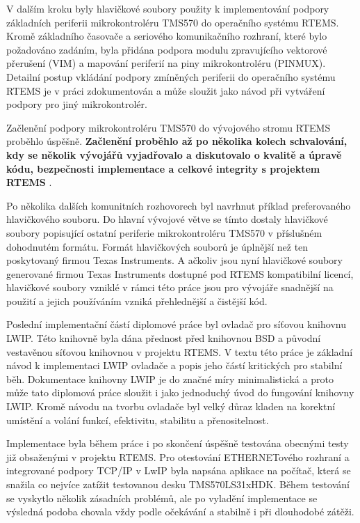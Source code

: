 V dalším kroku byly hlavičkové soubory použity k implementování podpory základních periferii mikrokontroléru TMS570 do operačního systému RTEMS.
Kromě základního časovače a seriového komunikačního rozhraní, které bylo požadováno zadáním, byla přidána podpora modulu zpravujícího vektorové přerušení (VIM) a mapování periferií na piny mikrokontroléru (PINMUX).
Detailní postup vkládání podpory zmíněných periferii do operačního systému RTEMS je v práci zdokumentován a může sloužit jako návod při vytváření podpory pro jiný mikrokontrolér.

Začlenění podpory mikrokontroléru TMS570 do vývojového stromu RTEMS proběhlo úspěšně.
{\bf Začlenění proběhlo až po několika kolech schvalování, kdy se několik vývojářů vyjadřovalo a diskutovalo o kvalitě a úpravě kódu, bezpečnosti implementace a celkové integrity s projektem RTEMS }.

Po několika dalších komunitních rozhovorech byl navrhnut příklad preferovaného hlavičkového souboru.
Do hlavní vývojové větve se tímto dostaly hlavičkové soubory popisující ostatní periferie mikrokontroléru TMS570 v příslušném dohodnutém formátu.
Formát hlavičkových souborů je úplnější než ten poskytovaný firmou Texas Instruments.
A ačkoliv jsou nyní hlavičkové soubory generované firmou Texas Instruments dostupné pod RTEMS kompatibilní licencí, hlavičkové soubory vzniklé v rámci této práce jsou pro vývojáře snadnější na použití a jejich používáním vzniká přehlednější a čistější kód. 

Poslední implementační částí diplomové práce byl ovladač pro síťovou knihovnu LWIP.
Této knihovně byla dána přednost před knihovnou BSD a původní vestavěnou síťovou knihovnou v projektu RTEMS.
V textu této práce je základní návod k implementaci LWIP ovladače a popis jeho částí kritických pro stabilní běh.
Dokumentace knihovny LWIP je do značné míry minimalistická a proto může tato diplomová práce sloužit i jako jednoduchý úvod do fungování knihovny LWIP.
Kromě návodu na tvorbu ovladače byl velký důraz kladen na korektní umístění a volání funkcí, efektivitu, stabilitu a přenositelnost.

Implementace byla během práce i po skončení úspěšně testována obecnými testy již obsaženými v projektu RTEMS.
Pro otestování ETHERNETového rozhraní a integrované podpory TCP/IP v LwIP byla napsána aplikace na počítač, která se snažila co nejvíce zatížit testovanou desku TMS570LS31xHDK.
Během testování se vyskytlo několik zásadních problémů, ale po vyladění implementace se výsledná podoba chovala vždy podle očekávání a stabilně i při dlouhodobé zátěži.




\bye
\grid
